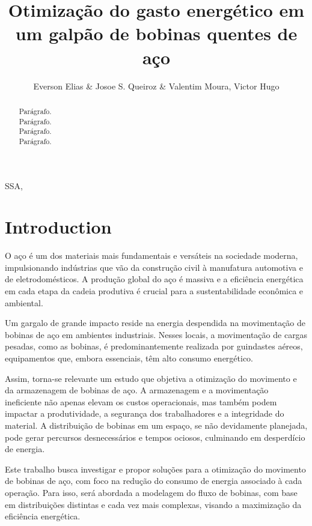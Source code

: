 \documentclass[journal]{IEEEtran}
\begin{document}
    \title{Otimização do gasto energético em um galpão de bobinas quentes de aço}
    \nocite{*}
    \author{Everson Elias \& Josoe S. Queiroz \& Valentim Moura, Victor Hugo} 
    
    \maketitle
    	
    \begin{abstract}
        Parágrafo.\\
        Parágrafo.\\
        Parágrafo.\\
        Parágrafo.
    \end{abstract}
    
    \begin{IEEEkeywords}
        SSA, 
    \end{IEEEkeywords}
    
    \section{Introduction}

    O aço é um dos materiais mais fundamentais e versáteis na sociedade moderna, impulsionando indústrias que vão da construção civil à manufatura automotiva e de eletrodomésticos. A produção global do aço é massiva e a eficiência energética em cada etapa da cadeia produtiva é crucial para a sustentabilidade econômica e ambiental.

    Um gargalo de grande impacto reside na energia despendida na movimentação de bobinas de aço em ambientes industriais. Nesses locais, a movimentação de cargas pesadas, como as bobinas, é predominantemente realizada por guindastes aéreos, equipamentos que, embora essenciais, têm alto consumo energético.

        Assim, torna-se relevante um estudo que objetiva a otimização do movimento e da armazenagem de bobinas de aço. A armazenagem e a movimentação ineficiente não apenas elevam os custos operacionais, mas também podem impactar a produtividade, a segurança dos trabalhadores e a integridade do material. A distribuição de bobinas em um espaço, se não devidamente planejada, pode gerar percursos desnecessários e tempos ociosos, culminando em desperdício de energia.

        Este trabalho busca investigar e propor soluções para a otimização do movimento de bobinas de aço, com foco na redução do consumo de energia associado à cada operação. Para isso, será abordada a modelagem do fluxo de bobinas, com base em distribuições distintas e cada vez mais complexas, visando a maximização da eficiência energética.
\end{document}
